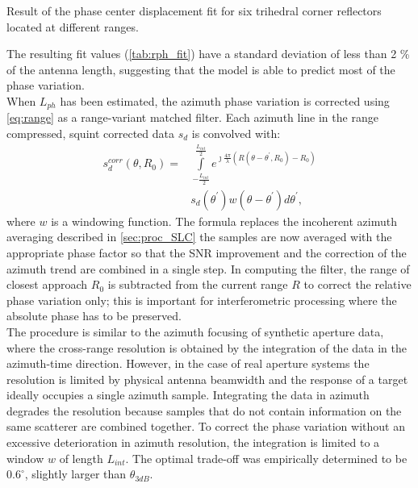 \begin{table}[ht]
	\centering
	\caption{Result of the phase center displacement fit for six trihedral corner reflectors located at different ranges.}
	\label{tab:rph_fit}
\end{table}
The resulting fit values (\autoref{tab:rph_fit}) have a standard deviation of less than 2 \% of the antenna length, suggesting that the model is able to predict  most of the phase variation.\\
When $L_{ph}$ has been estimated, the azimuth phase variation is corrected using \autoref{eq:range} as a range-variant matched filter. Each azimuth line in the range compressed, squint corrected data $s_{d}$ is convolved with:
\begin{equation}\label{eq:correction}
	\begin{aligned}
		s_{d}^{corr}\left(\theta, R_{0}\right) = &\int\limits_{-\frac{L_{int}}{2}}^{\frac{L_{int}}{2}}e^{\jmath \frac{4\pi}{\lambda}\left(R\left(\theta - \theta^{\prime}, R_{0}\right) - R_{0}\right)}\\
		&s_{d}\left(\theta^\prime\right)w(\theta - \theta^{\prime}) d\theta^\prime,
	\end{aligned}
\end{equation}
where $w$ is a windowing function. The formula replaces the incoherent azimuth averaging described in \autoref{sec:proc_SLC} the samples are now averaged with the appropriate phase factor so that the SNR improvement and the correction of the azimuth trend are combined in a single step. In computing the filter, the range of closest approach $R_{0}$ is subtracted from the current range $R$ to correct the relative phase variation only; this is important for interferometric processing where the absolute phase has to be preserved.\\
The procedure is similar to the azimuth focusing of synthetic aperture data, where the cross-range resolution is obtained by the integration of the data in the azimuth-time direction. However, in the case of real aperture systems the resolution is limited by  physical antenna beamwidth and the response of a target ideally occupies a single azimuth sample. Integrating the data in azimuth degrades the resolution because samples that do not contain information on the same scatterer are combined together. To correct the phase variation without an excessive deterioration in azimuth resolution, the integration is limited to a window  $w$ of length $L_{int}$. The optimal trade-off was empirically determined to be $0.6^\circ$, slightly larger than $\theta_{3dB}$.\\

